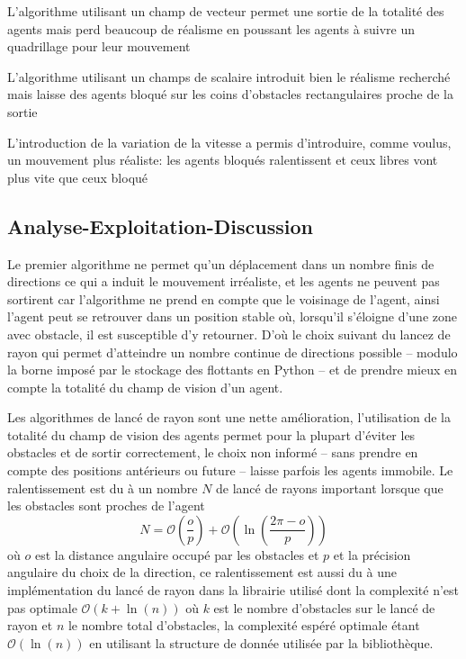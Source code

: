 \documentclass{article}
\newcommand{\bigo}{\mathcal{O}}
\begin{document}

L'algorithme utilisant un champ de vecteur permet une sortie de la totalité des
agents mais perd beaucoup de réalisme en poussant les agents à suivre un
quadrillage pour leur mouvement


L'algorithme utilisant un champs de scalaire introduit bien le réalisme recherché
mais laisse des agents bloqué sur les coins d'obstacles rectangulaires proche
de la sortie


L'introduction de la variation de la vitesse a permis d'introduire, comme voulus,
un mouvement plus réaliste: les agents bloqués ralentissent et ceux libres vont plus
vite que ceux bloqué


\subsection{Analyse-Exploitation-Discussion}

Le premier algorithme ne permet qu'un déplacement dans un nombre finis de directions
ce qui a induit le mouvement irréaliste, et les agents ne peuvent pas sortirent car
l'algorithme ne prend en compte que le voisinage de l'agent, ainsi l'agent peut se
retrouver dans un position stable où, lorsqu'il s'éloigne d'une zone avec obstacle,
il est susceptible d'y retourner. D'où le choix suivant du lancez de rayon qui
permet d'atteindre un nombre continue de directions possible -- modulo la borne
imposé par le stockage des flottants en Python -- et de prendre
mieux en compte la totalité du champ de vision d'un agent.

Les algorithmes de lancé de rayon sont une nette amélioration, l'utilisation
de la totalité du champ de vision des agents permet pour la plupart
d'éviter les obstacles et de sortir correctement, le choix non informé --
sans prendre en compte des positions antérieurs ou future -- laisse parfois les
agents immobile. Le ralentissement est du à un nombre $N$ de lancé de rayons
important lorsque que les obstacles sont proches de l'agent
\[
  N = \bigo\left(\frac{o}{p}\right) + \bigo\left(\ln\left(\frac{2 \pi - o}{p}\right)\right)
\]
où $o$ est la distance angulaire occupé par les obstacles et $p$ et la précision angulaire
du choix de la direction, ce ralentissement est aussi du à une implémentation
du lancé de rayon dans la librairie utilisé dont la complexité n'est pas optimale
$\bigo\left(k + \ln(n)\right)$ où $k$ est le nombre
d'obstacles sur le lancé de rayon et $n$ le nombre total d'obstacles, la complexité espéré
optimale
étant $\bigo(\ln(n))$ en utilisant la structure de donnée utilisée par la bibliothèque.
\end{document}
